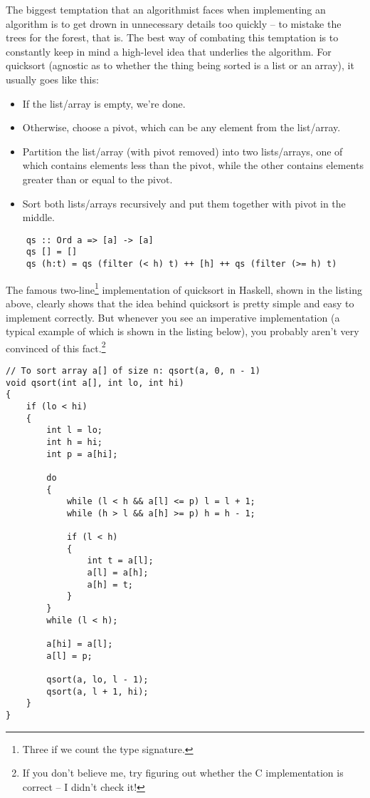 \documentclass[declaration,mgr,english,shortabstract]{iithesis}
\begin{document}
The biggest temptation that an algorithmist faces when implementing an algorithm is to get drown in unnecessary details too quickly -- to mistake the trees for the forest, that is. The best way of combating this temptation is to constantly keep in mind a high-level idea that underlies the algorithm. For quicksort (agnostic as to whether the thing being sorted is a list or an array), it usually goes like this:

\begin{itemize}
    \item If the list/array is empty, we're done.
    \item Otherwise, choose a pivot, which can be any element from the list/array.
    \item Partition the list/array (with pivot removed) into two lists/arrays, one of which contains elements less than the pivot, while the other contains elements greater than or equal to the pivot.
    \item Sort both lists/arrays recursively and put them together with pivot in the middle.
\end{itemize}

\begin{verbatim}
    qs :: Ord a => [a] -> [a]
    qs [] = []
    qs (h:t) = qs (filter (< h) t) ++ [h] ++ qs (filter (>= h) t)
\end{verbatim}

The famous two-line\footnote{Three if we count the type signature.} implementation of quicksort in Haskell, shown in the listing above, clearly shows that the idea behind quicksort is pretty simple and easy to implement correctly. But whenever you see an imperative implementation (a typical example of which is shown in the listing below), you probably aren't very convinced of this fact.\footnote{If you don't believe me, try figuring out whether the C implementation is correct -- I didn't check it!}

\begin{verbatim}
// To sort array a[] of size n: qsort(a, 0, n - 1)
void qsort(int a[], int lo, int hi)
{
    if (lo < hi)
    {
        int l = lo;
        int h = hi;
        int p = a[hi];

        do
        {
            while (l < h && a[l] <= p) l = l + 1;
            while (h > l && a[h] >= p) h = h - 1;

            if (l < h)
            {
                int t = a[l];
                a[l] = a[h];
                a[h] = t;
            }
        }
        while (l < h);

        a[hi] = a[l];
        a[l] = p;

        qsort(a, lo, l - 1);
        qsort(a, l + 1, hi);
    }
}
\end{verbatim}
\end{document}
